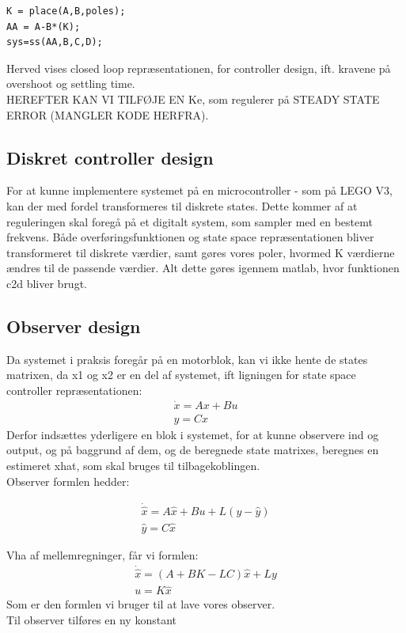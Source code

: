 \begin{lstlisting}
K = place(A,B,poles);
AA = A-B*(K);
sys=ss(AA,B,C,D);
\end{lstlisting}

Herved vises closed loop repræsentationen, for controller design, ift. kravene på overshoot og settling time.\\


HEREFTER KAN VI TILFØJE EN Ke, som regulerer på STEADY STATE ERROR (MANGLER KODE HERFRA). 

\subsection{Diskret controller design}
For at kunne implementere systemet på en microcontroller - som på LEGO V3, kan der med fordel transformeres til diskrete states. Dette kommer af at reguleringen skal foregå på et digitalt system, som sampler med en bestemt frekvens. 
Både overføringsfunktionen og state space repræsentationen bliver transformeret til diskrete værdier, samt gøres vores poler, hvormed K værdierne ændres til de passende værdier. Alt dette gøres igennem matlab, hvor funktionen c2d bliver brugt. 

\subsection{Observer design}
Da systemet i praksis foregår på en motorblok, kan vi ikke hente de states matrixen, da x1 og x2 er en del  af systemet, ift ligningen for state space controller repræsentationen: 
\begin{gather}
  \dot{x}=Ax+Bu \\
  y=Cx
\end{gather}
Derfor indsættes yderligere en blok i systemet, for at kunne observere ind og output, og på baggrund af dem, og de beregnede state matrixes, beregnes en estimeret xhat, som skal bruges til tilbagekoblingen. \\
Observer formlen hedder:


\begin{gather}
  \dot{\hat{x}}=A\hat{x}+Bu+L(y-\hat{y}) \\
  \hat{y}=C\hat{x}
\end{gather}

Vha af mellemregninger, får vi formlen: 
\begin{gather}
  \dot{\hat{x}}=(A+BK-LC)\hat{x}+Ly \\
  u=K\hat{x}
\end{gather}
Som er den formlen vi bruger til at lave vores observer.\\

Til observer tilføres en ny konstant
 